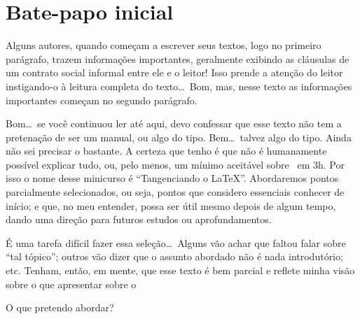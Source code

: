
\chapter*{Bate-papo inicial} 
\label{cha:intro}

Alguns autores, quando começam a escrever seus textos, logo no primeiro parágrafo, 
trazem informações importantes, geralmente exibindo as cláusulas de um contrato
social informal entre ele e o leitor!
Isso prende a atenção do leitor instigando-o à leitura completa do texto\ldots\
Bom, mas, nesse texto as informações importantes começam no segundo parágrafo. 
\emoji{smirking-face}

Bom\ldots\ se você continuou ler até aqui, devo confessar que esse texto não 
tem a pretenação de ser um manual, ou algo do tipo. 
Bem\ldots\ talvez algo do tipo. 
Ainda não sei precisar o bastante. 
A certeza que tenho é que não é humanamente possível explicar tudo, ou, pelo menos,
um mínimo aceitável sobre {\LaTeXX}\ em 3\unit{h}. 
Por isso o nome desse minicurso é ``{\fontins Tangenciando o \grega \LaTeX}''. 
Abordaremos pontos parcialmente selecionados, ou seja, pontos que considero 
essenciais conhecer de início; e que, no meu entender, possa ser útil mesmo 
depois de algum tempo, dando uma direção para futuros estudos ou aprofundamentos. 

É uma tarefa difícil fazer essa seleção\ldots\
Alguns vão achar que faltou falar sobre ``tal tópico''; outros vão dizer que 
o assunto abordado não é nada introdutório; etc. 
Tenham, então, em mente, que esse texto é bem parcial e reflete minha visão sobre 
o que  apresentar sobre o \LaTeXX\

O que pretendo abordar?


